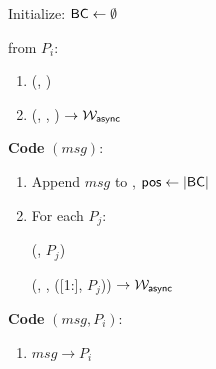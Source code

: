 \begin{bbox}[title={$\mathcal{F}_\msf{Atomic}$}]

Initialize: ${\mathsf {BC}} \leftarrow \emptyset$

\OnInput {} from $P_i$:
	\begin{enumerate}
		\item \Leak (, \Partyi)

		\item \Send (\Schedule, , ) $\rightarrow \mathcal{W}_{{\mathsf {async}}}$

	\end{enumerate}
   
{\bf \color{Black} Code}  $(msg)$:

	\begin{enumerate}
		\item Append $msg$ to , ${\mathsf {pos}} \leftarrow |{\mathsf {BC}}|$

		\item For each $P_j$:

			\quad \Leak (, $P_j$)

			\quad \Send (\Schedule, , ([1:], $P_j$)) $\rightarrow \mathcal{W}_{{\mathsf {async}}}$
		
    \end{enumerate}

{\bf \color{Black} Code}  $(msg, P_i)$:
\begin{enumerate}
	\item \Send $msg \rightarrow P_i$ 
\end{enumerate}


\end{bbox}
